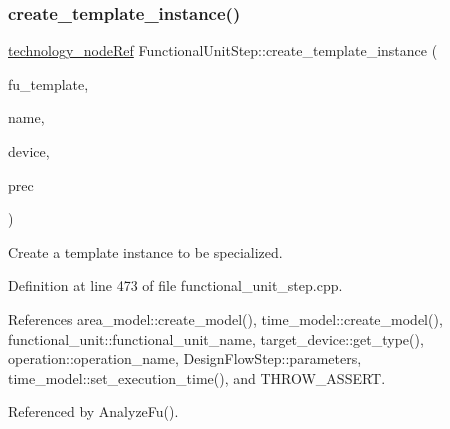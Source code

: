 \subsubsection{\texorpdfstring{create\+\_\+template\+\_\+instance()}{create\_template\_instance()}}
{\footnotesize\ttfamily \hyperlink{technology__node_8hpp_a33dd193b7bd6b987bf0d8a770a819fa7}{technology\+\_\+node\+Ref} Functional\+Unit\+Step\+::create\+\_\+template\+\_\+instance (\begin{DoxyParamCaption}\item[{const \hyperlink{technology__node_8hpp_a33dd193b7bd6b987bf0d8a770a819fa7}{technology\+\_\+node\+Ref} \&}]{fu\+\_\+template,  }\item[{std\+::string \&}]{name,  }\item[{const \hyperlink{target__device_8hpp_acedb2b7a617e27e6354a8049fee44eda}{target\+\_\+device\+Ref} \&}]{device,  }\item[{unsigned int}]{prec }\end{DoxyParamCaption})\hspace{0.3cm}{\ttfamily [protected]}}



Create a template instance to be specialized. 



Definition at line 473 of file functional\+\_\+unit\+\_\+step.\+cpp.



References area\+\_\+model\+::create\+\_\+model(), time\+\_\+model\+::create\+\_\+model(), functional\+\_\+unit\+::functional\+\_\+unit\+\_\+name, target\+\_\+device\+::get\+\_\+type(), operation\+::operation\+\_\+name, Design\+Flow\+Step\+::parameters, time\+\_\+model\+::set\+\_\+execution\+\_\+time(), and T\+H\+R\+O\+W\+\_\+\+A\+S\+S\+E\+RT.



Referenced by Analyze\+Fu().

